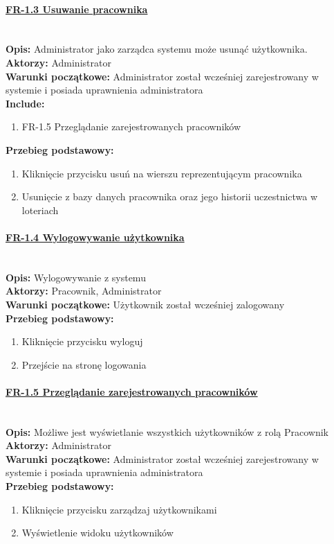 \paragraph{\underline{FR-1.3 Usuwanie pracownika}}\mbox{}\\[1mm]
	\noindent\textbf{Opis:}	Administrator jako zarządca systemu może usunąć użytkownika.\\
	\noindent\textbf{Aktorzy:} Administrator\\
	\textbf{Warunki początkowe:} Administrator został wcześniej zarejestrowany w systemie i posiada uprawnienia administratora\\
	\textbf{Include:} 
	\begin{enumerate}[noparskip]
		\item FR-1.5 Przeglądanie zarejestrowanych pracowników	
	\end{enumerate}
  \textbf{Przebieg podstawowy:}
	\begin{enumerate}[noparskip]
		\item Kliknięcie przycisku usuń na wierszu reprezentującym pracownika
    \item Usunięcie z bazy danych pracownika oraz jego historii uczestnictwa w loteriach
	\end{enumerate}

\paragraph{\underline{FR-1.4 Wylogowywanie użytkownika}}\mbox{}\\[1mm]
	\noindent\textbf{Opis:} Wylogowywanie z systemu\\
	\noindent\textbf{Aktorzy:} Pracownik, Administrator\\
	\textbf{Warunki początkowe:} Użytkownik został wcześniej zalogowany\\
	\textbf{Przebieg podstawowy:}
	\begin{enumerate}[noparskip]
		\item Kliknięcie przycisku wyloguj
		\item Przejście na stronę logowania
	\end{enumerate} 

\paragraph{\underline{FR-1.5 Przeglądanie zarejestrowanych pracowników}}\mbox{}\\[1mm]
	\noindent\textbf{Opis:} Możliwe jest wyświetlanie wszystkich użytkowników z rolą Pracownik\\
	\noindent\textbf{Aktorzy:} Administrator\\
	\textbf{Warunki początkowe:} Administrator został wcześniej zarejestrowany w systemie i posiada uprawnienia administratora\\
	\textbf{Przebieg podstawowy:}
	\begin{enumerate}[noparskip]
		\item Kliknięcie przycisku zarządzaj użytkownikami
		\item Wyświetlenie widoku użytkowników
	\end{enumerate} 


